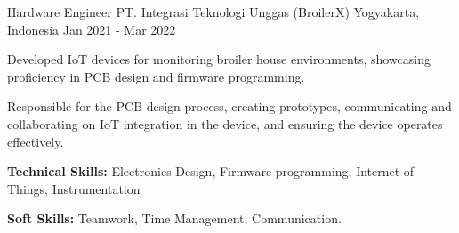 

\begin{cventries}

  \cventry
    {Hardware Engineer} %
    {PT. Integrasi Teknologi Unggas (BroilerX)} %
    {Yogyakarta, Indonesia} %
    {Jan 2021 - Mar 2022} %
    {
      \begin{cvitems} %
        \item {Developed IoT devices for monitoring broiler house environments, showcasing proficiency in PCB design and firmware programming.}
        \item {Responsible for the PCB design process, creating prototypes, communicating and collaborating on IoT integration in the device, and ensuring the device operates effectively.}
        \item {\textbf{Technical Skills:} Electronics Design, Firmware programming, Internet of Things, Instrumentation}
        \item {\textbf{Soft Skills:} Teamwork, Time Management, Communication.}
      \end{cvitems}
    }

\end{cventries}
